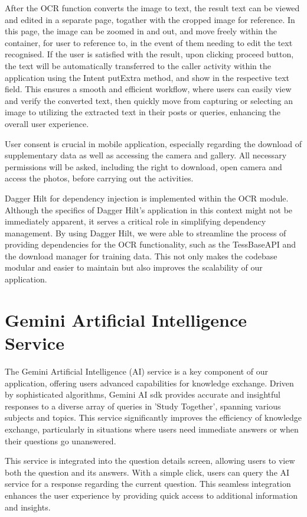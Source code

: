 After the OCR function converts the image to text, the result text can be viewed and edited in a separate page, togather with the cropped image for reference. In this page, the image can be zoomed in and out, and move freely within the container, for user to reference to, in the event of them needing to edit the text recognised. If the user is satisfied with the result, upon clicking proceed button, the text will be automatically transferred to the caller activity within the application using the Intent putExtra method, and show in the respective text field. This ensures a smooth and efficient workflow, where users can easily view and verify the converted text, then quickly move from capturing or selecting an image to utilizing the extracted text in their posts or queries, enhancing the overall user experience.

User consent is crucial in mobile application, especially regarding the download of supplementary data as well as accessing the camera and gallery. All necessary permissions will be asked, including the right to download, open camera and access the photos, before carrying out the activities.

Dagger Hilt for dependency injection is implemented within the OCR module. Although the specifics of Dagger Hilt's application in this context might not be immediately apparent, it serves a critical role in simplifying dependency management. By using Dagger Hilt, we were able to streamline the process of providing dependencies for the OCR functionality, such as the TessBaseAPI and the download manager for training data. This not only makes the codebase modular and easier to maintain but also improves the scalability of our application.

\section{Gemini Artificial Intelligence Service}

The Gemini Artificial Intelligence (AI) service is a key component of our application, offering users advanced capabilities for knowledge exchange. Driven by sophisticated algorithms, Gemini AI sdk provides accurate and insightful responses to a diverse array of queries in 'Study Together', spanning various subjects and topics. This service significantly improves the efficiency of knowledge exchange, particularly in situations where users need immediate answers or when their questions go unanswered. 

This service is integrated into the question details screen, allowing users to view both the question and its answers. With a simple click, users can query the AI service for a response regarding the current question. This seamless integration enhances the user experience by providing quick access to additional information and insights.

